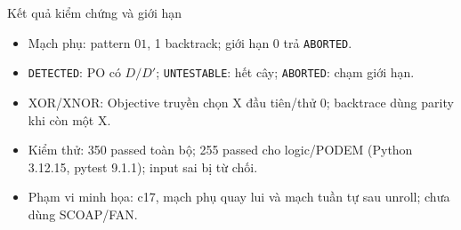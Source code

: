 \begin{frame}{Kết quả kiểm chứng và giới hạn}

\begin{itemize}
    \item Mạch phụ: pattern $01$, 1 backtrack; giới hạn 0 trả \texttt{ABORTED}.
    \item \texttt{DETECTED}: PO có $D/D'$; \texttt{UNTESTABLE}: hết cây; \texttt{ABORTED}: chạm giới hạn.
    \item XOR/XNOR: Objective truyền chọn X đầu tiên/thử 0; backtrace dùng parity khi còn một X.
    \item Kiểm thử: 350 passed toàn bộ; 255 passed cho logic/PODEM (Python 3.12.15, pytest 9.1.1); input sai bị từ chối.
    \item Phạm vi minh họa: c17, mạch phụ quay lui và mạch tuần tự sau unroll; chưa dùng SCOAP/FAN.
\end{itemize}

\end{frame}
